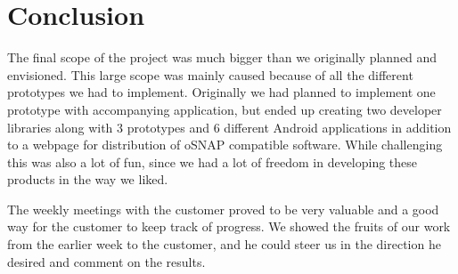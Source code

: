 \section{Conclusion}
The final scope of the project was much bigger than we originally planned and envisioned. This large scope
was mainly caused because of all the different prototypes we had to implement. Originally we had planned
to implement one prototype with accompanying application, but ended up creating two developer libraries
along with 3 prototypes and 6 different Android applications in addition to a webpage for distribution of oSNAP
compatible software. While challenging this was also a lot of fun, since we had a lot of freedom in developing
these products in the way we liked.

The weekly meetings with the customer proved to be very valuable and
a good way for the customer to keep track of progress. We showed the fruits of our work from the earlier
week to the customer, and he could steer us in the direction he desired and comment on the results.
